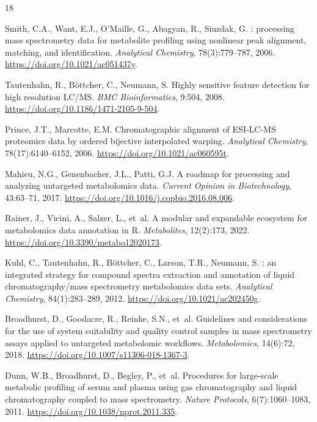 \documentclass[11pt,twoside,openright]{book}
\begin{document}
\FloatBarrier
\begin{thebibliography}{18}

Smith, C.A., Want, E.J., O'Maille, G., Abagyan, R., Siuzdak, G.
: processing mass spectrometry data for metabolite profiling using nonlinear peak alignment, matching, and identification.
\newblock \emph{Analytical Chemistry}, 78(3):779--787, 2006.
\newblock \url{https://doi.org/10.1021/ac051437y}.

Tautenhahn, R., B\"ottcher, C., Neumann, S.
\newblock Highly sensitive feature detection for high resolution {LC/MS}.
\newblock \emph{BMC Bioinformatics}, 9:504, 2008.
\newblock \url{https://doi.org/10.1186/1471-2105-9-504}.

Prince, J.T., Marcotte, E.M.
\newblock Chromatographic alignment of {ESI-LC-MS} proteomics data by ordered bijective interpolated warping.
\newblock \emph{Analytical Chemistry}, 78(17):6140--6152, 2006.
\newblock \url{https://doi.org/10.1021/ac060595t}.

Mahieu, N.G., Genenbacher, J.L., Patti, G.J.
\newblock A roadmap for processing and analyzing untargeted metabolomics data.
\newblock \emph{Current Opinion in Biotechnology}, 43:63--71, 2017.
\newblock \url{https://doi.org/10.1016/j.copbio.2016.08.006}.

Rainer, J., Vicini, A., Salzer, L., et~al.
\newblock A modular and expandable ecosystem for metabolomics data annotation in {R}.
\newblock \emph{Metabolites}, 12(2):173, 2022.
\newblock \url{https://doi.org/10.3390/metabo12020173}.

Kuhl, C., Tautenhahn, R., B\"ottcher, C., Larson, T.R., Neumann, S.
: an integrated strategy for compound spectra extraction and annotation of liquid chromatography/mass spectrometry metabolomics data sets.
\newblock \emph{Analytical Chemistry}, 84(1):283--289, 2012.
\newblock \url{https://doi.org/10.1021/ac202450g}.

Broadhurst, D., Goodacre, R., Reinke, S.N., et~al.
\newblock Guidelines and considerations for the use of system suitability and quality control samples in mass spectrometry assays applied to untargeted metabolomic workflows.
\newblock \emph{Metabolomics}, 14(6):72, 2018.
\newblock \url{https://doi.org/10.1007/s11306-018-1367-3}.

Dunn, W.B., Broadhurst, D., Begley, P., et~al.
\newblock Procedures for large-scale metabolic profiling of serum and plasma using gas chromatography and liquid chromatography coupled to mass spectrometry.
\newblock \emph{Nature Protocols}, 6(7):1060--1083, 2011.
\newblock \url{https://doi.org/10.1038/nprot.2011.335}.


\end{thebibliography}
\end{document}
